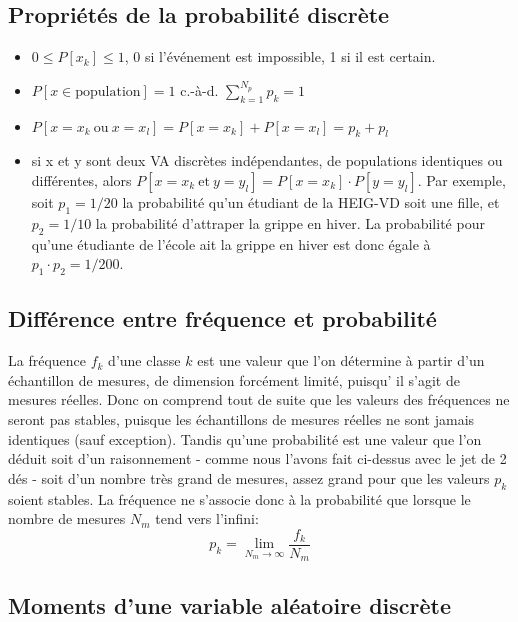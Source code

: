 \subsection{Propriétés de la probabilité discrète}

\begin{itemize}
\item $0\le P[x_k]\le 1$, 0 si l'événement est impossible, 1 si il est certain.
\item $P[x\in\text{population}]=1$ c.-à-d. $\sum_{k=1}^{N_p} p_k=1$
\item $P[x=x_k\ \text{ou}\ x=x_l]=P[x=x_k]+P[x=x_l]=p_k+p_l$
\item si x et y sont deux VA discrètes indépendantes, de populations identiques ou différentes, alors $P[x=x_k\ \text{et}\ y=y_l]=P[x=x_k]\cdot P[y=y_l]$. Par exemple, soit $p_1=1/20$ la probabilité qu'un étudiant de la HEIG-VD soit une fille, et $p_2=1/10$ la probabilité d'attraper la grippe en hiver. La probabilité pour qu'une étudiante de l'école ait la grippe en hiver est donc égale à $p_1\cdot p_2=1/200$.
\end{itemize}

\subsection{Différence entre fréquence et probabilité}

La fréquence $f_k$ d'une classe $k$ est une valeur que l'on détermine à partir d'un échantillon de mesures, de dimension forcément limité, puisqu’ il s'agit de mesures réelles. Donc on comprend tout de suite que les valeurs des fréquences ne seront pas stables, puisque les échantillons de mesures réelles ne sont jamais identiques (sauf exception). Tandis qu'une probabilité est une valeur que l'on déduit soit d'un raisonnement - comme nous l'avons fait ci-dessus avec le jet de 2 dés - soit d'un nombre très grand de mesures, assez grand pour que les valeurs $p_k$ soient stables. La fréquence ne s'associe donc à la probabilité que lorsque le nombre de mesures $N_m$ tend vers l'infini:
\begin{equation}
p_k=\lim_{N_m\rightarrow\infty}\frac{f_k}{N_m}
\end{equation}

\subsection{Moments d'une variable aléatoire discrète}\label{par:mdvad}

